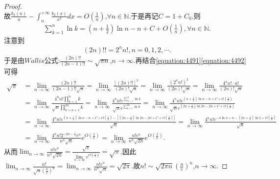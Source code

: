 \documentclass[lang=cn,newtx,10pt,scheme=chinese]{elegantbook}
\begin{document}
\begin{proof}
\[\]
故\(\frac{b_2(n)}{n} - \int_n^{+\infty}\frac{b_2(x)}{x^2}dx = O\left(\frac{1}{n}\right)\),\(\forall n\in\mathbb{N}\).于是再记\(C = 1 + C_0\),则
\begin{align}\label{equation:4491}
  \sum_{k = 1}^n\ln k=\left(n + \frac{1}{2}\right)\ln n - n + C + O\left(\frac{1}{n}\right),\forall n\in\mathbb{N} .
\end{align}
注意到
\begin{align}\label{equation:4492}
   (2n)!! = 2^n n!, n = 0,1,2,\cdots.
\end{align}
于是由\(Wallis\)公式:\(\frac{(2n)!!}{(2n - 1)!!}\sim\sqrt{\pi n}\),\(n\rightarrow\infty\).再结合\eqref{equation:4491}\eqref{equation:4492}可得
\begin{align*}
   \sqrt{\pi}&=\underset{n\rightarrow \infty}{\lim}\frac{\left( 2n \right) !!}{\left( 2n-1 \right) !!\sqrt{n}}=\underset{n\rightarrow \infty}{\lim}\frac{\left[ \left( 2n \right) !! \right] ^2}{\left( 2n \right) !\sqrt{n}}=\underset{n\rightarrow \infty}{\lim}\frac{\left( 2^nn! \right) ^2}{\left( 2n \right) !\sqrt{n}}=\underset{n\rightarrow \infty}{\lim}\frac{4^nn!\cdot n!}{\left( 2n \right) !\sqrt{n}}
\\
&=\underset{n\rightarrow \infty}{\lim}\frac{4^nn!\prod\limits_{k=1}^n{k}}{\sqrt{n}\prod\limits_{k=n+1}^{2n}{k}}=\underset{n\rightarrow \infty}{\lim}\frac{4^nn!e^{\sum\limits_{k=1}^n{\ln k}}}{\sqrt{n}e^{\sum\limits_{k=1}^{2n}{\ln k}}}=\underset{n\rightarrow \infty}{\lim}\frac{4^nn!e^{\left( n+\frac{1}{2} \right) \ln n-n+C+O\left( \frac{1}{n} \right)}}{\sqrt{n}e^{\left( 2n+\frac{1}{2} \right) \ln 2n-2n+C+O\left( \frac{1}{n} \right)}}
\\
&=\underset{n\rightarrow \infty}{\lim}\frac{4^nn!e^{\left( n+\frac{1}{2} \right) \ln n-n+C+O\left( \frac{1}{n} \right) -\left[ \left( 2n+\frac{1}{2} \right) \ln 2n-2n+C+O\left( \frac{1}{n} \right) \right]}}{\sqrt{n}}=\underset{n\rightarrow \infty}{\lim}\frac{4^nn!e^{-n\ln n+n-\left( 2n+\frac{1}{2} \right) \ln 2+O\left( \frac{1}{n} \right)}}{\sqrt{n}}
\\
&=\underset{n\rightarrow \infty}{\lim}\frac{4^nn!2^{-2n-\frac{1}{2}}e^n}{n^n\sqrt{n}}e^{O\left( \frac{1}{n} \right)}=\underset{n\rightarrow \infty}{\lim}\frac{n!e^n}{n^n\sqrt{2n}}e^{O\left( \frac{1}{n} \right)}.
\end{align*}
从而\(\lim_{n\rightarrow\infty}\frac{n!e^n}{n^n\sqrt{2n}}=\frac{\sqrt{\pi}}{\lim\limits_{n\rightarrow\infty}e^{O\left(\frac{1}{n}\right)}}=\sqrt{\pi}\).因此\(\lim_{n\rightarrow\infty}\frac{n!}{\sqrt{n}\left(\frac{n}{e}\right)^n}=\lim_{n\rightarrow\infty}\frac{n!e^n}{n^n\sqrt{n}}=\sqrt{2\pi}\).故\(n!\sim\sqrt{2\pi n}\left(\frac{n}{e}\right)^n\),\(n\rightarrow\infty\).
\end{proof}
\end{document}
